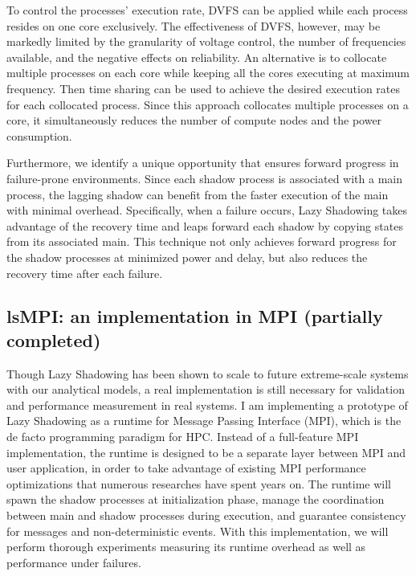 To control the processes' execution rate, DVFS can be applied while each process resides on one core exclusively. 
The effectiveness of DVFS, however, may be markedly 
limited by the granularity of voltage control, the number of frequencies available, and the negative effects on 
reliability. 
An alternative is to collocate multiple processes on each core while keeping all the cores executing at maximum frequency. 
Then time sharing can be used to achieve the desired execution rates for each collocated process. 
Since this approach collocates multiple processes on a core, it simultaneously reduces the number of compute nodes and 
the power consumption. 

Furthermore, we identify a unique opportunity that ensures forward progress in failure-prone environments. Since each shadow process is associated with a main process, the lagging shadow can benefit from the faster execution 
of the main with minimal overhead. Specifically, when a failure occurs, Lazy Shadowing takes advantage of 
the recovery time and leaps forward each shadow by copying states from its associated main. This technique not only achieves forward 
progress for the shadow processes at minimized power and delay, but also reduces the recovery time after each failure.

\subsection{lsMPI: an implementation in MPI (partially completed)}

Though Lazy Shadowing has been shown to scale to future extreme-scale systems with our analytical models, a real implementation 
is still necessary for validation and performance measurement in real systems. I am implementing a prototype of Lazy 
Shadowing as a runtime for Message Passing Interface (MPI), which is the de facto programming paradigm for HPC. Instead of 
a full-feature MPI implementation, the runtime is designed to be a separate layer between MPI and user application, in order 
to take advantage of existing MPI performance optimizations that numerous researches have spent years on. The runtime will spawn 
the shadow processes at initialization phase, manage the coordination between main and shadow processes during execution, 
and guarantee consistency for messages and non-deterministic events. With this implementation, we will perform thorough 
experiments measuring its runtime overhead as well as performance under failures.

